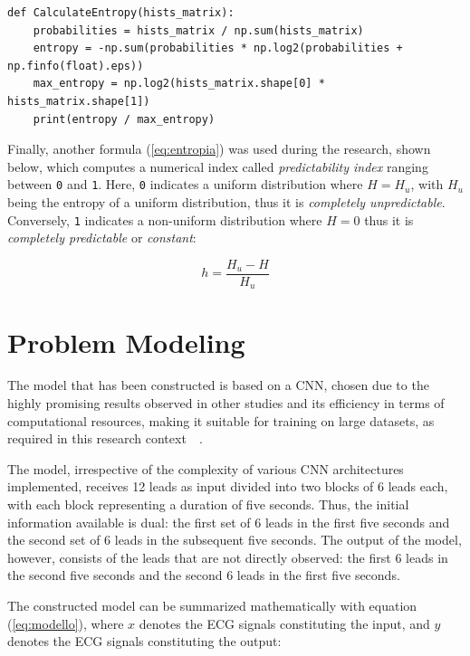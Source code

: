 \documentclass[12pt,italian]{report}
\begin{document}
\lstset{language=Python}
\begin{lstlisting}[aboveskip=15pt, belowskip=15pt, basicstyle=\fontsize{8}{10}\selectfont, keywordstyle=\color{blue}, breaklines=true, label=snippet:entropia]
def CalculateEntropy(hists_matrix):
    probabilities = hists_matrix / np.sum(hists_matrix)
    entropy = -np.sum(probabilities * np.log2(probabilities + np.finfo(float).eps))
    max_entropy = np.log2(hists_matrix.shape[0] * hists_matrix.shape[1])
    print(entropy / max_entropy)
\end{lstlisting}

Finally, another formula (\ref{eq:entropia}) was used during the research, shown below, which computes a numerical index called \textit{predictability index} ranging between \texttt{0} and \texttt{1}. Here, \texttt{0} indicates a uniform distribution where $ H = H_{u} $, with $ H_{u} $ being the entropy of a uniform distribution, thus it is \textit{completely unpredictable}. Conversely, \texttt{1} indicates a non-uniform distribution where $ H = 0 $ thus it is \textit{completely predictable} or \textit{constant}:

\begin{equation}
    h = \frac{H_{u} - H}{H_{u}}
    \label{eq:entropia}
\end{equation}

\section{Problem Modeling}
\label{sec:modellazione}

The model that has been constructed is based on a CNN, chosen due to the highly promising results observed in other studies and its efficiency in terms of computational resources, making it suitable for training on large datasets, as required in this research context~\cite{ribeiro}~\cite{hannun}.

The model, irrespective of the complexity of various CNN architectures implemented, receives 12 leads as input divided into two blocks of 6 leads each, with each block representing a duration of five seconds. Thus, the initial information available is dual: the first set of 6 leads in the first five seconds and the second set of 6 leads in the subsequent five seconds. The output of the model, however, consists of the leads that are not directly observed: the first 6 leads in the second five seconds and the second 6 leads in the first five seconds.

The constructed model can be summarized mathematically with equation (\ref{eq:modello}), where $ x $ denotes the ECG signals constituting the input, and $ y $ denotes the ECG signals constituting the output:
\end{document}
